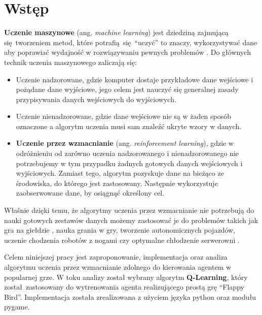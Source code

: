 \documentclass[a4paper, 12pt,oneside]{book}
\newcommand\chap[1]{%
  \chapter*{#1}%
  \addcontentsline{toc}{chapter}{#1}}
\begin{document}
\sloppy
\thispagestyle{empty}

\newpage{}

\thispagestyle{empty}
\newpage{}

\tableofcontents{}
\newpage


\chap{Wstęp}
\textbf{Uczenie maszynowe} (ang. \textit{machine learning}) jest dziedziną
zajmującą się tworzeniem metod, które potrafią się ``uczyć'' to znaczy,
wykorzystywać dane aby poprawiać wydajność w rozwiązywaniu pewnych
problemów \cite{machine_learning_definition}.
Do głównych technik uczenia maszynowego zaliczają się:
\begin{itemize}
	\setlength\itemsep{-0.4em}
\item Uczenie nadzorowane, gdzie komputer dostaje przykładowe dane wejściowe i
	pożądane dane wyjściowe, jego celem jest nauczyć się generalnej zasady
	przypisywania danych wejściowych do wyjściowych.
\item Uczenie nienadzorowane, gdzie dane wejściowe nie są w żaden sposób
	oznaczone a algorytm uczenia musi sam znaleźć ukryte wzory w danych.
\item \textbf{Uczenie przez wzmacnianie}
	(ang. \textit{reinforcement learning}), gdzie w odróżnieniu od zarówno
	uczenia 
	nadzorowanego i nienadzorowanego nie potrzebujemy w tym przypadku
	żadnych	gotowych danych wejściowych i wyjściowych. Zamiast tego,
	algorytm pozyskuje dane na bieżąco ze środowiska, do którego jest
	zastosowany. Następnie wykorzystuje zaobserwowane dane, by osiągnąć
	określony cel.
\end{itemize}

Właśnie dzięki temu, że algorytmy uczenia przez wzmacnianie nie potrzebują do
nauki gotowych
zestawów danych możemy zastosować je do problemów takich jak gra na
giełdzie \cite{trading_reinforcement}, nauka grania w gry, tworzenie
autonomicznych pojazdów, uczenie chodzenia robotów z nogami czy optymalne
chłodzenie serwerowni \cite{reinforcement_applications}.

Celem niniejszej pracy jest zaproponowanie, implementacja oraz analiza
algorytmu uczenia przez wzmacnianie zdolnego do kierowania agentem w popularnej
grze. W toku analizy został wybrany algorytm \textbf{Q-Learning}, który
został zastosowany do wytrenowania agenta realizującego prostą grę ``Flappy
Bird''. Implementacja została zrealizowana z użyciem języka python oraz modułu
pygame.
\end{document}
